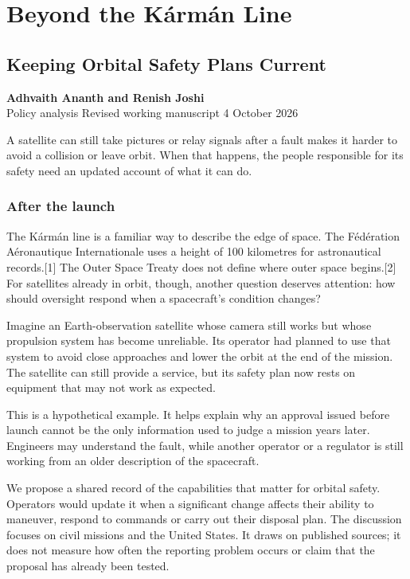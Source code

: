 \documentclass[11pt,letterpaper]{article}
\begin{document}
\hypertarget{beyond-the-kuxe1rmuxe1n-line}{%
\section{Beyond the Kármán Line}\label{beyond-the-kuxe1rmuxe1n-line}}

\hypertarget{keeping-orbital-safety-plans-current}{%
\subsection{Keeping Orbital Safety Plans
Current}\label{keeping-orbital-safety-plans-current}}

\textbf{Adhvaith Ananth and Renish Joshi}\\
Policy analysis \textbar{} Revised working manuscript \textbar{} 4
October 2026

A satellite can still take pictures or relay signals after a fault makes
it harder to avoid a collision or leave orbit. When that happens, the
people responsible for its safety need an updated account of what it can
do.

\hypertarget{after-the-launch}{%
\subsubsection{After the launch}\label{after-the-launch}}

The Kármán line is a familiar way to describe the edge of space. The
Fédération Aéronautique Internationale uses a height of 100 kilometres
for astronautical records.{[}1{]} The Outer Space Treaty does not define
where outer space begins.{[}2{]} For satellites already in orbit,
though, another question deserves attention: how should oversight
respond when a spacecraft's condition changes?

Imagine an Earth-observation satellite whose camera still works but
whose propulsion system has become unreliable. Its operator had planned
to use that system to avoid close approaches and lower the orbit at the
end of the mission. The satellite can still provide a service, but its
safety plan now rests on equipment that may not work as expected.

This is a hypothetical example. It helps explain why an approval issued
before launch cannot be the only information used to judge a mission
years later. Engineers may understand the fault, while another operator
or a regulator is still working from an older description of the
spacecraft.

We propose a shared record of the capabilities that matter for orbital
safety. Operators would update it when a significant change affects
their ability to maneuver, respond to commands or carry out their
disposal plan. The discussion focuses on civil missions and the United
States. It draws on published sources; it does not measure how often the
reporting problem occurs or claim that the proposal has already been
tested.
\end{document}
